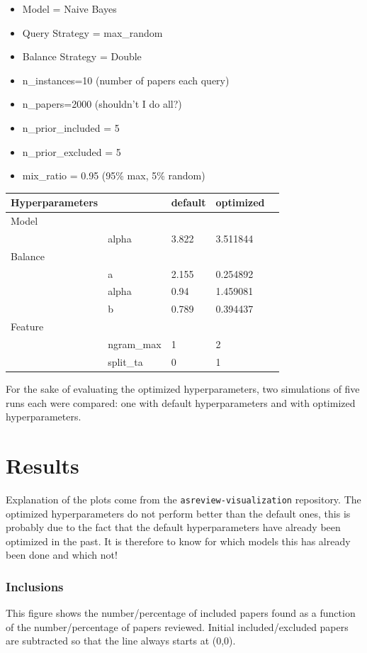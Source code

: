 \documentclass[
]{book}
\providecommand{\tightlist}{%
  \setlength{\itemsep}{0pt}\setlength{\parskip}{0pt}}
\begin{document}
\begin{itemize}
\tightlist
\item
  Model = Naive Bayes
\item
  Query Strategy = max\_random
\item
  Balance Strategy = Double
\item
  n\_instances=10 (number of papers each query)
\item
  n\_papers=2000 (shouldn't I do all?)
\item
  n\_prior\_included = 5
\item
  n\_prior\_excluded = 5
\item
  mix\_ratio = 0.95 (95\% max, 5\% random)
\end{itemize}

\begin{longtable}[]{@{}lllll@{}}
\toprule
Hyperparameters & & default & optimized &\tabularnewline
\midrule
\endhead
Model & & & &\tabularnewline
& alpha & 3.822 & 3.511844 &\tabularnewline
Balance & & & &\tabularnewline
& a & 2.155 & 0.254892 &\tabularnewline
& alpha & 0.94 & 1.459081 &\tabularnewline
& b & 0.789 & 0.394437 &\tabularnewline
Feature & & & &\tabularnewline
& ngram\_max & 1 & 2 &\tabularnewline
& split\_ta & 0 & 1 &\tabularnewline
\bottomrule
\end{longtable}

For the sake of evaluating the optimized hyperparameters, two simulations of five runs each were compared: one with default hyperparameters and with optimized hyperparameters.

\hypertarget{results}{%
\section{Results}\label{results}}

Explanation of the plots come from the \texttt{asreview-visualization} repository.
The optimized hyperparameters do not perform better than the default ones, this is probably due to the fact that the default hyperparameters have already been optimized in the past. It is therefore to know for which models this has already been done and which not!

\pagebreak

\hypertarget{inclusions}{%
\subsubsection{Inclusions}\label{inclusions}}

This figure shows the number/percentage of included papers found as a function of the
number/percentage of papers reviewed. Initial included/excluded papers are subtracted so that the line
always starts at (0,0).
\end{document}
